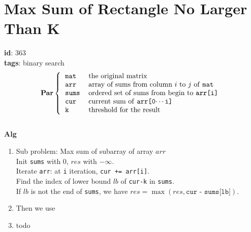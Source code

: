 \documentclass{article}
\begin{document}
\clearpage %
\section*{Max Sum of Rectangle No Larger Than K }
\textbf{id}: 363 \\
\textbf{tags}: binary search\\
\[
\textbf{Par} \left\lbrace
\begin{tabular}{ll}
    \texttt{mat}    & the original matrix\\
    \texttt{arr}    & array of sums from column $i$ to $j$ of \texttt{mat}\\
    \texttt{sums}   & ordered set of sums from begin to \texttt{arr[i]} \\
    \texttt{cur}    & current sum of \texttt{arr[0$\cdots$i]} \\
    \texttt{k}      & threshold for the result\\
\end{tabular}
\right.
\]
\\
\textbf{Alg}
\begin{enumerate}
\item
    Sub problem: Max sum of subarray of array $arr$ \\
    Init \texttt{sums} with 0, $res$ with $-\infty$.\\
    Iterate \texttt{arr}: at \texttt{i} iteration, \texttt{cur += arr[i]}. \\
    Find the index of lower bound $lb$ of \texttt{cur-k} in \texttt{sums}. \\
    If $lb$ is not the end of \texttt{sums}, we have
        $res = \max(res, \texttt{cur - sums[lb]})$.

\item
    Then we use 
\item
    todo

\end{enumerate}

\clearpage
\end{document}
